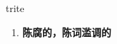 
\begin{frame}
{\huge trite}
\begin{center}
\begin{enumerate}\Large
  \item \textbf{陈腐的，陈词滥调的}
\end{enumerate}
\end{center}
\end{frame}
